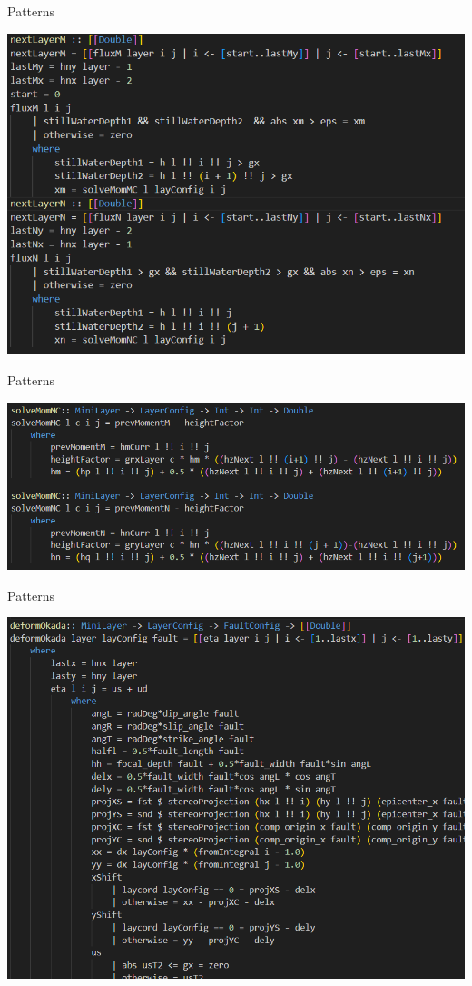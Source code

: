 \documentclass{beamer}
\begin{document}
\begin{frame}{Patterns}
    \begin{center}
        \includegraphics[scale=0.5]{figure/pattern2.png}
    \end{center}
\end{frame}

\begin{frame}{Patterns}
    \begin{center}
        \includegraphics[scale=0.4]{figure/pattern3.png}
    \end{center}
\end{frame}

\begin{frame}{Patterns}
    \begin{center}
        \includegraphics[scale=0.4]{figure/pattern4.png}
    \end{center}
\end{frame}
\end{document}

